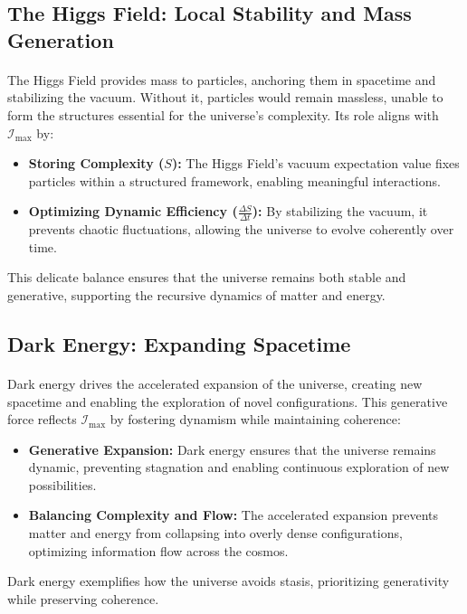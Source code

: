 \documentclass[12pt]{article}
\begin{document}
\subsection{The Higgs Field: Local Stability and Mass Generation}
\paragraph{}
The Higgs Field provides mass to particles, anchoring them in spacetime and stabilizing the vacuum. Without it, particles would remain massless, unable to form the structures essential for the universe’s complexity. Its role aligns with \(\mathcal{I}_{\text{max}}\) by:
\begin{itemize}
    \item \textbf{Storing Complexity (\(S\)):} The Higgs Field’s vacuum expectation value fixes particles within a structured framework, enabling meaningful interactions.
    \item \textbf{Optimizing Dynamic Efficiency (\(\frac{\Delta S}{\Delta t}\)):} By stabilizing the vacuum, it prevents chaotic fluctuations, allowing the universe to evolve coherently over time.
\end{itemize}
This delicate balance ensures that the universe remains both stable and generative, supporting the recursive dynamics of matter and energy.

\subsection{Dark Energy: Expanding Spacetime}
\paragraph{}
Dark energy drives the accelerated expansion of the universe, creating new spacetime and enabling the exploration of novel configurations. This generative force reflects \(\mathcal{I}_{\text{max}}\) by fostering dynamism while maintaining coherence:
\begin{itemize}
    \item \textbf{Generative Expansion:} Dark energy ensures that the universe remains dynamic, preventing stagnation and enabling continuous exploration of new possibilities.
    \item \textbf{Balancing Complexity and Flow:} The accelerated expansion prevents matter and energy from collapsing into overly dense configurations, optimizing information flow across the cosmos.
\end{itemize}
Dark energy exemplifies how the universe avoids stasis, prioritizing generativity while preserving coherence.
\end{document}
